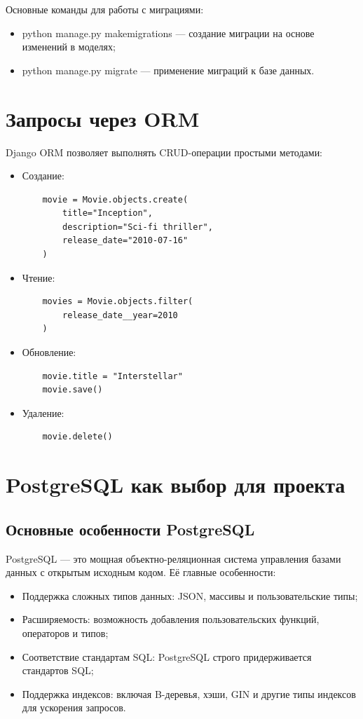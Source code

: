 Основные команды для работы с миграциями:
\begin{itemize}
    \item python manage.py makemigrations — создание миграции на основе изменений в моделях;
    \item python manage.py migrate — применение миграций к базе данных.
\end{itemize}

\section{Запросы через ORM}
Django ORM позволяет выполнять CRUD-операции простыми методами:
\begin{itemize}
    \item Создание:
    \begin{verbatim}
    movie = Movie.objects.create(
        title="Inception",
        description="Sci-fi thriller",
        release_date="2010-07-16"
    )
    \end{verbatim}
    \item Чтение:
    \begin{verbatim}
    movies = Movie.objects.filter(
        release_date__year=2010
    )
    \end{verbatim}
    \item Обновление:
    \begin{verbatim}
    movie.title = "Interstellar"
    movie.save()
    \end{verbatim}
    \item Удаление:
    \begin{verbatim}
    movie.delete()
    \end{verbatim}
\end{itemize}

\section{PostgreSQL как выбор для проекта}

\subsection*{Основные особенности PostgreSQL}
PostgreSQL — это мощная объектно-реляционная система управления базами данных с открытым исходным кодом. Её главные особенности:
\begin{itemize}
    \item Поддержка сложных типов данных: JSON, массивы и пользовательские типы;
    \item Расширяемость: возможность добавления пользовательских функций, операторов и типов;
    \item Соответствие стандартам SQL: PostgreSQL строго придерживается стандартов SQL;
    \item Поддержка индексов: включая B-деревья, хэши, GIN и другие типы индексов для ускорения запросов.
\end{itemize}

